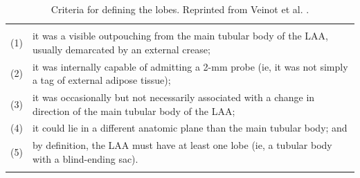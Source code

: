 \begin{table}[t]
  \centering
  \caption{Criteria for defining the \laa lobes. Reprinted from Veinot et al. \cite{veinot1997_AnatomyNormalLeft}.}
  \label{tab:bg_laa_lobes_criteria}
  \begin{tabular}{IL}
    \hline\noalign{\smallskip}
    \\
    \noalign{\smallskip}\hline\noalign{\smallskip}
    (1) & {\footnotesize it was a visible outpouching from the main tubular body of the LAA, usually
    demarcated by an external crease; } \\
    (2) & {\footnotesize  it was internally capable of admitting a
    2-mm probe (ie, it was not simply a tag of external adipose tissue); } \\
    (3) & {\footnotesize it was
    occasionally but not necessarily associated with a change in direction of the
    main tubular body of the LAA; } \\
    (4) & {\footnotesize it could lie in a different anatomic plane
    than the main tubular body; and } \\
    (5) & {\footnotesize by definition, the LAA must have at least
    one lobe (ie, a tubular body with a blind-ending sac).} \\
    \noalign{\smallskip}\hline\noalign{\smallskip}
  \end{tabular}
\end{table}



